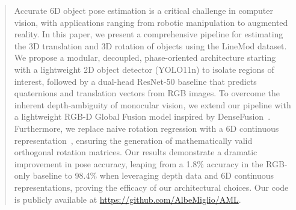 \begin{abstract}
Accurate 6D object pose estimation is a critical challenge in computer vision, with applications ranging from robotic manipulation to augmented reality. In this paper, we present a comprehensive pipeline for estimating the 3D translation and 3D rotation of objects using the LineMod dataset. We propose a modular, decoupled, phase-oriented architecture starting with a lightweight 2D object detector (YOLO11n) to isolate regions of interest, followed by a dual-head ResNet-50 baseline that predicts quaternions and translation vectors from RGB images. To overcome the inherent depth-ambiguity of monocular vision, we extend our pipeline with a lightweight RGB-D Global Fusion model inspired by DenseFusion~\cite{wang2019densefusion}. Furthermore, we replace naive rotation regression with a 6D continuous representation~\cite{zhou2019continuity}, ensuring the generation of mathematically valid orthogonal rotation matrices. Our results demonstrate a dramatic improvement in pose accuracy, leaping from a 1.8\% accuracy in the RGB-only baseline to 98.4\% when leveraging depth data and 6D continuous representations, proving the efficacy of our architectural choices. Our code is publicly available at \url{https://github.com/AlbeMiglio/AML}.
\end{abstract}
